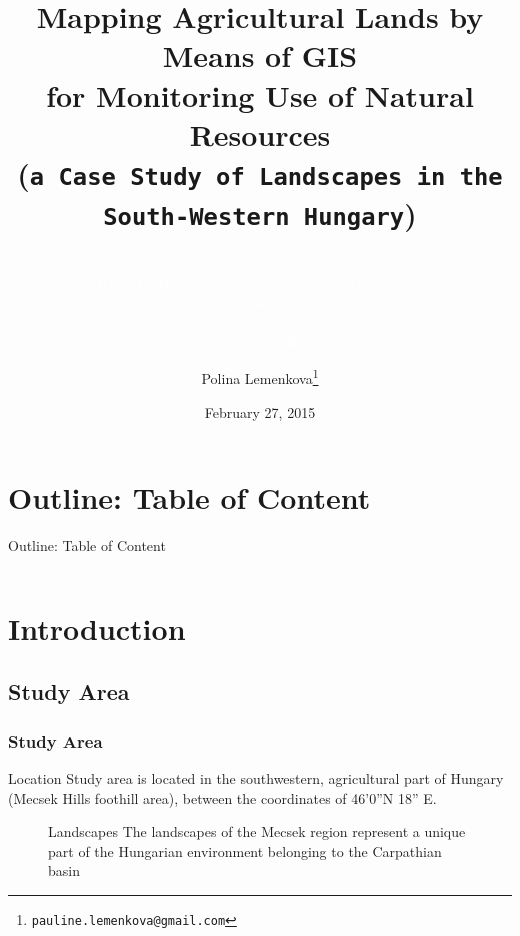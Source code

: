 \documentclass[pdflatex,compress,10pt,
	xcolor={dvipsnames,dvipsnames,svgnames,x11names,table},
	hyperref={
	breaklinks = true, 
	pdfauthor={Lemenkova Polina}, 
	pdfsubject={Preentation}, 
	pdfcreator={Lemenkova Polina}, 
	pdfproducer={Lemenkova Polina}, 
	citecolor=NavyBlue, 
	urlcolor = NavyBlue, 
	breaklinks = true}]{beamer}
\title[\textcolor{red}{Mapping Agricultural Lands by Means of GIS ... in the South-Western Hungary}]{Mapping Agricultural Lands by Means of GIS \\
for Monitoring Use of Natural Resources \\
(\texttt{a Case Study of Landscapes in the South-Western Hungary})}
\subtitle{\textcolor{white}{\textnormal{Presented at:\\
\emph{Actual Problems of the Conservation and Development \\of Biological Resources}\\
Ural State Agrarian University (UrGAU),\\
Yekaterinburg, Russia}}}
\author{Polina Lemenkova\footnote{\texttt{pauline.lemenkova@gmail.com}}}
\date{February 27, 2015}
\begin{document}
\begin{frame}
  \maketitle
\end{frame}

\section*{Outline: Table of Content}
\begin{frame}{Outline: Table of Content}
    \begin{columns}[onlytextwidth,T]
        \begin{column}{.5\textwidth}
            \footnotesize{\tableofcontents[sections=1-5]}
        \end{column}
        \begin{column}{.5\textwidth}
            \footnotesize{\tableofcontents[sections=6-12]}
        \end{column}
    \end{columns}
\end{frame}

\section{Introduction}
\subsection{Study Area}
\begin{frame}\frametitle{Study Area}

\begin{block}{Location}
Study area is located in the southwestern, agricultural part of Hungary (Mecsek Hills foothill area), between the coordinates of 46'0''N 18'' E.
\end{block}

\begin{figure}[H]
	\centering
			\hspace{1mm}

\begin{alertblock}{Landscapes}
The landscapes of the Mecsek region represent a unique part of the Hungarian environment belonging to the Carpathian basin
\end{alertblock}

\end{figure}
\end{frame}
\end{document}
